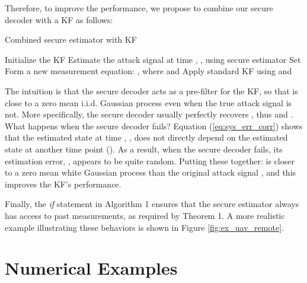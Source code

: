 \documentclass[journal]{IEEEtran}
\begin{document}
Therefore, to improve the performance, we propose to combine our secure decoder with a KF as follows:
\begin{algorithm}
\caption{Combined secure estimator with KF}
\label{al:se_kf}
\begin{algorithmic}[1]
\State Initialize the KF
	\If{}
		\State Estimate the attack signal at time , , using secure estimator
	\Else
		\State Set 
	\EndIf
	\State Form a new measurement equation: , where  and 
	\State Apply standard KF using  and  
\EndFor
\end{algorithmic}
\end{algorithm}

\noindent
The intuition is that the secure decoder acts as a pre-filter for the KF, so that  is close to a zero mean i.i.d. Gaussian process even when the true attack signal  is not. More specifically, the secure decoder usually perfectly recovers , thus  and . What happens when the secure decoder fails? Equation (\ref{eq:sys_err_corr}) shows that the estimated state at time , , does not directly depend on the estimated state at another time point  (). As a result, when the secure decoder fails, its estimation error, , appears to be quite random. Putting these together:  is closer to a zero mean white Gaussian process than the original attack signal , and this improves the KF's performance. 

Finally, the \textit{if} statement in Algorithm 1 ensures that the secure estimator always has access to  past measurements, as required by Theorem 1.
A more realistic example illustrating these behaviors is shown in Figure \ref{fig:ex_uav_remote}.




\section{Numerical Examples}\label{sec:examples}
\end{document}

